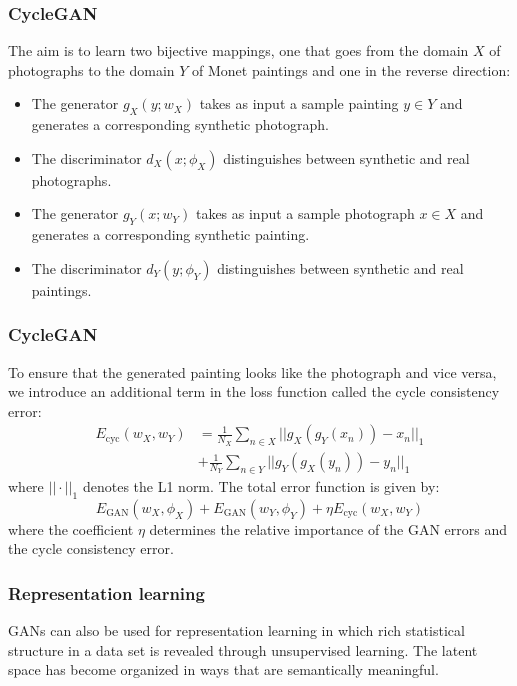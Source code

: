 \documentclass{beamer}
\begin{document}
\begin{frame}
    \frametitle{CycleGAN}
    The aim is to learn two bijective mappings, one that goes from the domain $X$ of photographs to the domain $Y$ of Monet paintings and one in the reverse direction:
    \begin{itemize}
        \item The generator $g_{X}(y;w_{X})$ takes as input a sample painting $y\in{}Y$ and generates a corresponding synthetic photograph.
        \item The discriminator $d_{X}(x;\phi_{X})$ distinguishes between synthetic and real photographs.
        \item The generator $g_{Y}(x;w_{Y})$ takes as input a sample photograph $x\in{}X$ and generates a corresponding synthetic painting.
        \item The discriminator $d_{Y}(y;\phi_{Y})$ distinguishes between synthetic and real paintings.
    \end{itemize}
\end{frame}

\begin{frame}
    \frametitle{CycleGAN}
    To ensure that the generated painting looks like the photograph and vice versa, we introduce an additional term in the loss function called the cycle consistency error:
    \begin{align*}
        E_{\textrm{cyc}}(w_{X},w_{Y})&=\frac{1}{N_{X}}\sum_{n\in{}X}||g_{X}(g_{Y}(x_{n}))-x_{n}||_{1} \\
        &+\frac{1}{N_{Y}}\sum_{n\in{}Y}||g_{Y}(g_{X}(y_{n}))-y_{n}||_{1}
    \end{align*}
    where $||\cdot||_{1}$ denotes the L1 norm. The total error function is given by:
    \begin{equation*}
        E_{\textrm{GAN}}(w_{X},\phi_{X})+E_{\textrm{GAN}}(w_{Y},\phi_{Y})+\eta{}E_{\textrm{cyc}}(w_{X},w_{Y})
    \end{equation*}
    where the coefficient $\eta$ determines the relative importance of the GAN errors and the cycle consistency error.
\end{frame}

\begin{frame}
    \frametitle{Representation learning}
    GANs can also be used for representation learning in which rich statistical structure in a data set is revealed through unsupervised learning. The latent space has become organized in ways that are semantically meaningful.
\end{frame}
\end{document}
